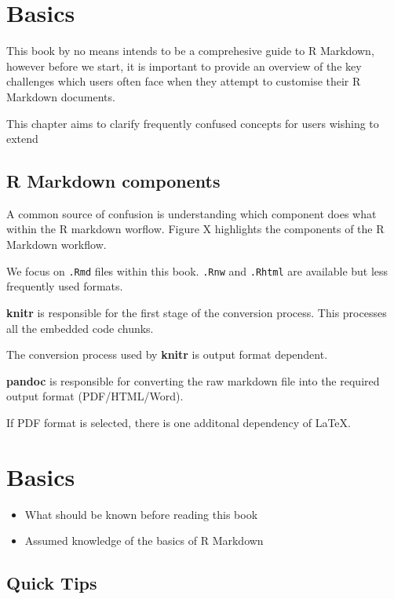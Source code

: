 \documentclass[]{book}
\providecommand{\tightlist}{%
  \setlength{\itemsep}{0pt}\setlength{\parskip}{0pt}}
\begin{document}
\chapter{Basics}\label{basics}

This book by no means intends to be a comprehesive guide to R Markdown,
however before we start, it is important to provide an overview of the
key challenges which users often face when they attempt to customise
their R Markdown documents.

This chapter aims to clarify frequently confused concepts for users
wishing to extend

\section{R Markdown components}\label{r-markdown-components}

A common source of confusion is understanding which component does what
within the R markdown worflow. Figure X highlights the components of the
R Markdown workflow.

We focus on \texttt{.Rmd} files within this book. \texttt{.Rnw} and
\texttt{.Rhtml} are available but less frequently used formats.

\textbf{knitr} is responsible for the first stage of the conversion
process. This processes all the embedded code chunks.

The conversion process used by \textbf{knitr} is output format
dependent.

\textbf{pandoc} is responsible for converting the raw markdown file into
the required output format (PDF/HTML/Word).

If PDF format is selected, there is one additonal dependency of LaTeX.

\chapter{Basics}\label{basics-1}

\begin{itemize}
\tightlist
\item
  What should be known before reading this book
\item
  Assumed knowledge of the basics of R Markdown
\end{itemize}

\section{Quick Tips}\label{quick-tips}
\end{document}
